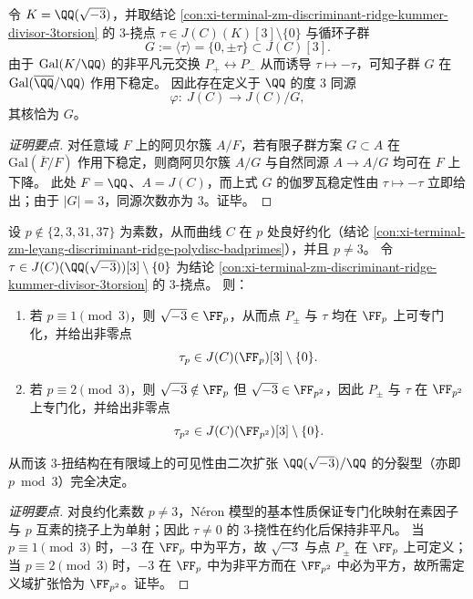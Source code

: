 \begin{conclusion}\label{con:xi-terminal-zm-discriminant-ridge-3isogeny-descent}
令 \(K=\QQ(\sqrt{-3})\)，并取结论 \ref{con:xi-terminal-zm-discriminant-ridge-kummer-divisor-3torsion} 的 \(3\)-挠点 \(\tau\in J(C)(K)[3]\setminus\{0\}\) 与循环子群
\[
G:=\langle \tau\rangle=\{0,\pm \tau\}\subset J(C)[3].
\]
由于 \(\mathrm{Gal}(K/\QQ)\) 的非平凡元交换 \(P_{+}\leftrightarrow P_{-}\) 从而诱导 \(\tau\mapsto -\tau\)，可知子群 \(G\) 在 \(\mathrm{Gal}(\overline{\QQ}/\QQ)\) 作用下稳定。
因此存在定义于 \(\QQ\) 的度 \(3\) 同源
\[
\varphi:\ J(C)\longrightarrow J(C)/G,
\]
其核恰为 \(G\)。
\end{conclusion}
\begin{proof}[证明要点]
对任意域 \(F\) 上的阿贝尔簇 \(A/F\)，若有限子群方案 \(G\subset A\) 在 \(\mathrm{Gal}(\overline F/F)\) 作用下稳定，则商阿贝尔簇 \(A/G\) 与自然同源 \(A\to A/G\) 均可在 \(F\) 上下降。
此处 \(F=\QQ\)、\(A=J(C)\)，而上式 \(G\) 的伽罗瓦稳定性由 \(\tau\mapsto -\tau\) 立即给出；由于 \(|G|=3\)，同源次数亦为 \(3\)。证毕。
\end{proof}

\begin{conclusion}\label{con:xi-terminal-zm-discriminant-ridge-3torsion-specialization}
设 \(p\notin\{2,3,31,37\}\) 为素数，从而曲线 \(C\) 在 \(p\) 处良好约化（结论 \ref{con:xi-terminal-zm-leyang-discriminant-ridge-polydisc-badprimes}），并且 \(p\neq 3\)。
令 \(\tau\in J(C)(\QQ(\sqrt{-3}))[3]\setminus\{0\}\) 为结论 \ref{con:xi-terminal-zm-discriminant-ridge-kummer-divisor-3torsion} 的 \(3\)-挠点。
则：
\begin{enumerate}
  \item 若 \(p\equiv 1\pmod 3\)，则 \(\sqrt{-3}\in\FF_{p}\)，从而点 \(P_{\pm}\) 与 \(\tau\) 均在 \(\FF_{p}\) 上可专门化，并给出非零点
  \[
  \tau_{p}\in J(C)(\FF_{p})[3]\setminus\{0\}.
  \]
  \item 若 \(p\equiv 2\pmod 3\)，则 \(\sqrt{-3}\notin\FF_{p}\) 但 \(\sqrt{-3}\in\FF_{p^{2}}\)，因此 \(P_{\pm}\) 与 \(\tau\) 在 \(\FF_{p^{2}}\) 上专门化，并给出非零点
  \[
  \tau_{p^{2}}\in J(C)(\FF_{p^{2}})[3]\setminus\{0\}.
  \]
\end{enumerate}
从而该 \(3\)-扭结构在有限域上的可见性由二次扩张 \(\QQ(\sqrt{-3})/\QQ\) 的分裂型（亦即 \(p\bmod 3\)）完全决定。
\end{conclusion}
\begin{proof}[证明要点]
对良约化素数 \(p\neq 3\)，N\'eron 模型的基本性质保证专门化映射在素因子与 \(p\) 互素的挠子上为单射；因此 \(\tau\neq 0\) 的 \(3\)-挠性在约化后保持非平凡。
当 \(p\equiv 1\pmod 3\) 时，\(-3\) 在 \(\FF_{p}\) 中为平方，故 \(\sqrt{-3}\) 与点 \(P_{\pm}\) 在 \(\FF_{p}\) 上可定义；
当 \(p\equiv 2\pmod 3\) 时，\(-3\) 在 \(\FF_p\) 中为非平方而在 \(\FF_{p^2}\) 中必为平方，故所需定义域扩张恰为 \(\FF_{p^2}\)。证毕。
\end{proof}

